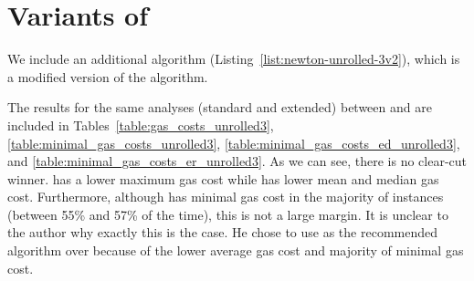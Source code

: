 \section{Variants of \UnrolledThree{}}
\label{app:variants_unrolled3}

We include an additional algorithm
\UnrolledThreeV{} (Listing~\ref{list:newton-unrolled-3v2}),
which is a modified version of the \UnrolledThree{} algorithm.

The results for the same analyses (standard and extended) between
\UnrolledThree{} and \UnrolledThreeV{} are included
in Tables~\ref{table:gas_costs_unrolled3},
\ref{table:minimal_gas_costs_unrolled3},
\ref{table:minimal_gas_costs_ed_unrolled3}, and
\ref{table:minimal_gas_costs_er_unrolled3}.
As we can see, there is no clear-cut winner.
\UnrolledThreeV{} has a lower maximum gas cost while
\UnrolledThree{} has lower mean and median gas cost.
Furthermore, although \UnrolledThree{} has minimal gas cost
in the majority of instances (between 55\% and 57\% of the time),
this is not a large margin.
It is unclear to the author why exactly this is the case.
He chose to use \UnrolledThree{} as the recommended algorithm
over \UnrolledThreeV{} because of the lower average gas cost
and majority of minimal gas cost.



